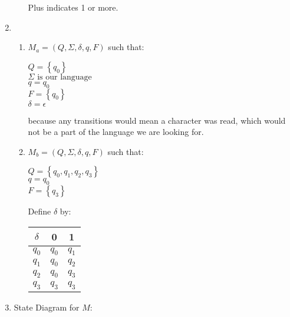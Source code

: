 \documentclass{article}
\newcommand{\set}[1]{{\left\{#1\right\}}}    %
\begin{document}
\begin{enumerate}
\begin{enumerate}
                Plus indicates 1 or more.
        \end{enumerate}
    \item %
        \begin{enumerate}
            \item
                $M_a = (Q, \Sigma, \delta, q, F)$ such that:

                $Q = \set{q_0}$ \\
                $\Sigma \text{ is our language }$ \\
                $q = q_0$ \\
                $F = \set{q_0}$ \\
                $\delta = \epsilon$

                because any transitions would mean a character was read, which would not be a part of the language we are looking for.
            \item
                $M_b = (Q, \Sigma, \delta, q, F)$ such that:

                $Q = \set{q_0, q_1, q_2, q_3}$ \\
                $q = q_0$ \\
                $F = \set{q_3}$

                Define $\delta$ by:

                \begin{tabular}{|c | c   c|}
                    \hline
                    $\delta$ & 0      & 1 \\
                    \hline
                    $q_0$    & $q_0$  & $q_1$ \\
                    $q_1$    & $q_0$  & $q_2$ \\
                    $q_2$    & $q_0$  & $q_3$ \\
                    $q_3$    & $q_3$  & $q_3$ \\
                    \hline
                \end{tabular}
        \end{enumerate}
    \item %
        State Diagram for $M$:



\end{enumerate}
\end{document}
